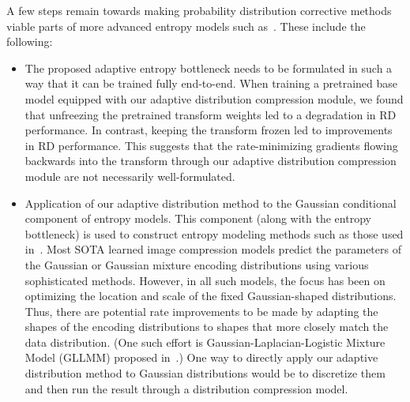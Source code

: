 A few steps remain towards making probability distribution corrective methods viable parts of more advanced entropy models such as~\cite{balle2018variational,cheng2020learned,he2022elic}.
These include the following:
%
\begin{itemize}
  \item
    The proposed adaptive entropy bottleneck needs to be formulated in such a way that it can be trained fully end-to-end.
    When training a pretrained base model equipped with our adaptive distribution compression module, we found that unfreezing the pretrained transform weights led to a degradation in RD performance.
    In contrast, keeping the transform frozen led to improvements in RD performance.
    This suggests that the rate-minimizing gradients flowing backwards into the transform through our adaptive distribution compression module are not necessarily well-formulated.
  \item
    Application of our adaptive distribution method to the Gaussian conditional component of entropy models.
    This component (along with the entropy bottleneck) is used to construct entropy modeling methods such as those used in~\cite{balle2018variational,cheng2020learned,he2022elic}.
    Most SOTA learned image compression models predict the parameters of the Gaussian or Gaussian mixture encoding distributions using various sophisticated methods.
    However, in all such models, the focus has been on optimizing the location and scale of the fixed Gaussian-shaped distributions.
    Thus, there are potential rate improvements to be made by adapting the shapes of the encoding distributions to shapes that more closely match the data distribution.
    (One such effort is Gaussian-Laplacian-Logistic Mixture Model (GLLMM) proposed in~\cite{fu2021learned}.)
    One way to directly apply our adaptive distribution method to Gaussian distributions would be to discretize them and then run the result through a distribution compression model.
\end{itemize}




